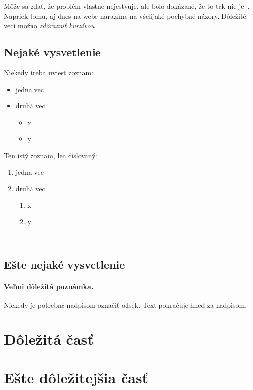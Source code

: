 \documentclass[10pt,twoside,slovak,a4paper]{coursepaper}
\begin{document}
Môže sa zdať, že problém vlastne nejestvuje\cite{Coplien:MPD}, ale bolo dokázané, že to tak nie je~\cite{Czarnecki:Staged, Czarnecki:Progress}. Napriek tomu, aj dnes na webe narazíme na všelijaké pochybné názory\cite{PLP-Framework}. Dôležité veci možno \emph{zdôrazniť kurzívou}.


\subsection{Nejaké vysvetlenie} \label{ina:nejake}

Niekedy treba uviesť zoznam:

\begin{itemize}
\item jedna vec
\item druhá vec
	\begin{itemize}
	\item x
	\item y
	\end{itemize}
\end{itemize}

Ten istý zoznam, len číslovaný:

\begin{enumerate}
\item jedna vec
\item druhá vec
	\begin{enumerate}
	\item x
	\item y
	\end{enumerate}
\end{enumerate}-


\subsection{Ešte nejaké vysvetlenie} \label{ina:este}

\paragraph{Veľmi dôležitá poznámka.}
Niekedy je potrebné nadpisom označiť odsek. Text pokračuje hneď za nadpisom.



\section{Dôležitá časť} \label{dolezita}




\section{Ešte dôležitejšia časť} \label{dolezitejsia}
\end{document}
